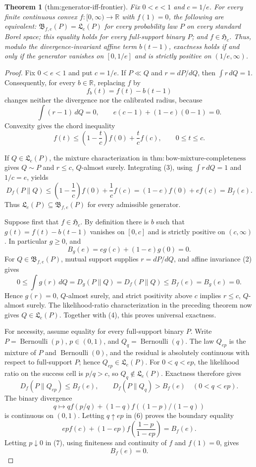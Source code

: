 \documentclass{article}
\newtheorem{theorem}{Theorem}
\begin{document}
\begin{theorem}[thm:generator-iff-frontier]\label{thm:generator-iff-frontier}
Fix \(0<e<1\) and \(c=1/e\). For every finite continuous convex \(f:[0,\infty)\to\mathbb R\) with \(f(1)=0\), the following are equivalent: \(\mathfrak B_{f,e}(P)=\mathfrak L_e(P)\) for every probability law \(P\) on every standard Borel space; this equality holds for every full-support binary \(P\); and \(f\in\mathfrak H_c\). Thus, modulo the divergence-invariant affine term \(b(t-1)\), exactness holds if and only if the generator vanishes on \([0,1/e]\) and is strictly positive on \((1/e,\infty)\).
\end{theorem}
\begin{proof}
Fix \(0<e<1\) and put \(c=1/e\).  If \(P\ll Q\) and \(r=dP/dQ\), then \(\int r\,dQ=1\).  Consequently, for every \(b\in\mathbb R\), replacing \(f\) by
\[
 f_b(t)=f(t)-b(t-1)
\]
changes neither the divergence nor the calibrated radius, because
\[
 \int(r-1)\,dQ=0,
 \qquad
 e(c-1)+(1-e)(0-1)=0. \tag{2}
\]
Convexity gives the chord inequality
\[
 f(t)\le \left(1-\frac{t}{c}\right)f(0)+\frac{t}{c}f(c),
 \qquad 0\le t\le c. \tag{3}
\]

If \(Q\in\mathfrak L_e(P)\), the mixture characterization in \(\mathrm{thm:bow\text{-}mixture\text{-}completeness}\) gives \(Q\sim P\) and \(r\le c\), \(Q\)-almost surely.  Integrating (3), using \(\int r\,dQ=1\) and \(1/c=e\), yields
\[
 D_f(P\|Q)
 \le \left(1-\frac1c\right)f(0)+\frac1c f(c)
 =(1-e)f(0)+ef(c)=B_f(e). \tag{4}
\]
Thus \(\mathfrak L_e(P)\subseteq\mathfrak B_{f,e}(P)\) for every admissible generator.

Suppose first that \(f\in\mathfrak H_c\).  By definition there is \(b\) such that \(g(t)=f(t)-b(t-1)\) vanishes on \([0,c]\) and is strictly positive on \((c,\infty)\).  In particular \(g\ge0\), and
\[
 B_g(e)=eg(c)+(1-e)g(0)=0. \tag{5}
\]
For \(Q\in\mathfrak B_{f,e}(P)\), mutual support supplies \(r=dP/dQ\), and affine invariance (2) gives
\[
 0\le \int g(r)\,dQ=D_g(P\|Q)=D_f(P\|Q)\le B_f(e)=B_g(e)=0.
\]
Hence \(g(r)=0\), \(Q\)-almost surely, and strict positivity above \(c\) implies \(r\le c\), \(Q\)-almost surely.  The likelihood-ratio characterization in the preceding theorem now gives \(Q\in\mathfrak L_e(P)\).  Together with (4), this proves universal exactness.

For necessity, assume equality for every full-support binary \(P\).  Write \(P=\operatorname{Bernoulli}(p)\), \(p\in(0,1)\), and \(Q_q=\operatorname{Bernoulli}(q)\).  The law \(Q_{ep}\) is the mixture of \(P\) and \(\operatorname{Bernoulli}(0)\), and the residual is absolutely continuous with respect to full-support \(P\); hence \(Q_{ep}\in\mathfrak L_e(P)\).  For \(0<q<ep\), the likelihood ratio on the success cell is \(p/q>c\), so \(Q_q\notin\mathfrak L_e(P)\).  Exactness therefore gives
\[
 D_f(P\|Q_{ep})\le B_f(e),
 \qquad
 D_f(P\|Q_q)>B_f(e)\quad(0<q<ep). \tag{6}
\]
The binary divergence
\[
 q\longmapsto qf(p/q)+(1-q)f((1-p)/(1-q))
\]
is continuous on \((0,1)\).  Letting \(q\uparrow ep\) in (6) proves the boundary equality
\[
 epf(c)+(1-ep)f\!\left(\frac{1-p}{1-ep}\right)=B_f(e). \tag{7}
\]
Letting \(p\downarrow0\) in (7), using finiteness and continuity of \(f\) and \(f(1)=0\), gives
\[
 B_f(e)=0. \tag{8}
\]


\end{proof}
\end{document}
